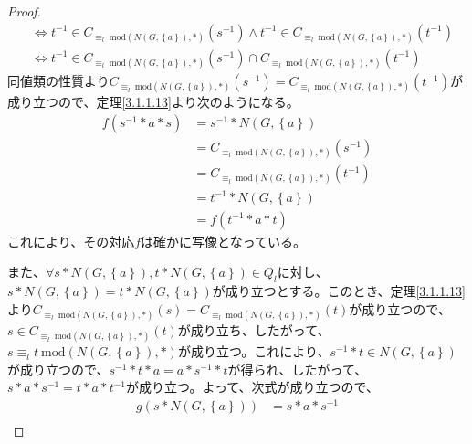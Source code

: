 \documentclass[dvipdfmx]{jsarticle}
\begin{document}
\begin{proof}
\begin{align*}
&\Leftrightarrow t^{- 1} \in C_{\equiv_{l}\ \mathrm{mod}\left( N\left( G,\left\{ a \right\} \right),* \right)}\left( s^{- 1} \right) \land t^{- 1} \in C_{\equiv_{l}\ \mathrm{mod}\left( N\left( G,\left\{ a \right\} \right),* \right)}\left( t^{- 1} \right)\\
&\Leftrightarrow t^{- 1} \in C_{\equiv_{l}\ \mathrm{mod}\left( N\left( G,\left\{ a \right\} \right),* \right)}\left( s^{- 1} \right) \cap C_{\equiv_{l}\ \mathrm{mod}\left( N\left( G,\left\{ a \right\} \right),* \right)}\left( t^{- 1} \right)
\end{align*}
同値類の性質より$C_{\equiv_{l}\ \mathrm{mod}\left( N\left( G,\left\{ a \right\} \right),* \right)}\left( s^{- 1} \right) = C_{\equiv_{l}\ \mathrm{mod}\left( N\left( G,\left\{ a \right\} \right),* \right)}\left( t^{- 1} \right)$が成り立つので、定理\ref{3.1.1.13}より次のようになる。
\begin{align*}
f\left( s^{- 1}*a*s \right) &= s^{- 1}*N\left( G,\left\{ a \right\} \right)\\
&= C_{\equiv_{l}\ \mathrm{mod}\left( N\left( G,\left\{ a \right\} \right),* \right)}\left( s^{- 1} \right)\\
&= C_{\equiv_{l}\ \mathrm{mod}\left( N\left( G,\left\{ a \right\} \right),* \right)}\left( t^{- 1} \right)\\
&= t^{- 1}*N\left( G,\left\{ a \right\} \right)\\
&= f\left( t^{- 1}*a*t \right)
\end{align*}
これにより、その対応$f$は確かに写像となっている。\par
また、$\forall s*N\left( G,\left\{ a \right\} \right),t*N\left( G,\left\{ a \right\} \right) \in Q_{l}$に対し、$s*N\left( G,\left\{ a \right\} \right) = t*N\left( G,\left\{ a \right\} \right)$が成り立つとする。このとき、定理\ref{3.1.1.13}より$C_{\equiv_{l}\ \mathrm{mod}\left( N\left( G,\left\{ a \right\} \right),* \right)}(s) = C_{\equiv_{l}\ \mathrm{mod}\left( N\left( G,\left\{ a \right\} \right),* \right)}(t)$が成り立つので、$s \in C_{\equiv_{l}\ \mathrm{mod}\left( N\left( G,\left\{ a \right\} \right),* \right)}(t)$が成り立ち、したがって、$s \equiv_{l}t\ \mathrm{mod}\left( N\left( G,\left\{ a \right\} \right),* \right)$が成り立つ。これにより、$s^{- 1}*t \in N\left( G,\left\{ a \right\} \right)$が成り立つので、$s^{- 1}*t*a = a*s^{- 1}*t$が得られ、したがって、$s*a*s^{- 1} = t*a*t^{- 1}$が成り立つ。よって、次式が成り立つので、
\begin{align*}
g\left( s*N\left( G,\left\{ a \right\} \right) \right) &= s*a*s^{- 1}\\

\end{align*}
\end{proof}
\end{document}
